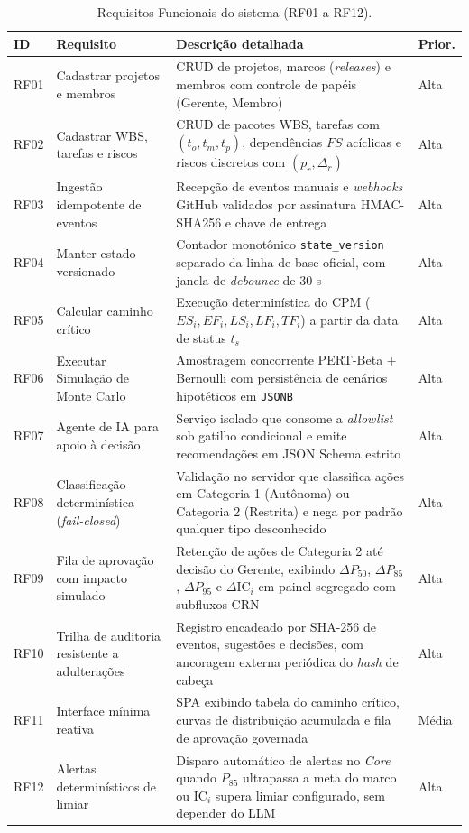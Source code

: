 \documentclass[12pt,openany,oneside,a4paper,english,brazilian,sumario=tradicional]{abntex2}
\newcommand{\fonteautores}{\par\vspace{1mm}{\small Fonte: Elaborado pelos autores (2026).}}
\newcommand{\IC}{\mathrm{IC}}
\begin{document}
\begin{table}[htbp]
\caption{Requisitos Funcionais do sistema (RF01 a RF12).}\label{tab:rf}
\footnotesize
\begin{tabularx}{\textwidth}{L{1cm} L{3.9cm} Y L{1.1cm}}
\toprule
\textbf{ID} & \textbf{Requisito} & \textbf{Descrição detalhada} & \textbf{Prior.}\\
\midrule
RF01 & Cadastrar projetos e membros & CRUD de projetos, marcos (\textit{releases}) e membros com controle de papéis (Gerente, Membro) & Alta\\
RF02 & Cadastrar WBS, tarefas e riscos & CRUD de pacotes WBS, tarefas com $(t_o,t_m,t_p)$, dependências $FS$ acíclicas e riscos discretos com $(p_r, \Delta_r)$ & Alta\\
RF03 & Ingestão idempotente de eventos & Recepção de eventos manuais e \textit{webhooks} GitHub validados por assinatura HMAC-SHA256 e chave de entrega & Alta\\
RF04 & Manter estado versionado & Contador monotônico \texttt{state\_version} separado da linha de base oficial, com janela de \textit{debounce} de 30 s & Alta\\
RF05 & Calcular caminho crítico & Execução determinística do CPM ($ES_i, EF_i, LS_i, LF_i, TF_i$) a partir da data de status $t_s$ & Alta\\
RF06 & Executar Simulação de Monte Carlo & Amostragem concorrente PERT-Beta + Bernoulli com persistência de cenários hipotéticos em \texttt{JSONB} & Alta\\
RF07 & Agente de IA para apoio à decisão & Serviço isolado que consome a \textit{allowlist} sob gatilho condicional e emite recomendações em JSON Schema estrito & Alta\\
RF08 & Classificação determinística (\textit{fail-closed}) & Validação no servidor que classifica ações em Categoria 1 (Autônoma) ou Categoria 2 (Restrita) e nega por padrão qualquer tipo desconhecido & Alta\\
RF09 & Fila de aprovação com impacto simulado & Retenção de ações de Categoria 2 até decisão do Gerente, exibindo $\Delta P_{50}$, $\Delta P_{85}$, $\Delta P_{95}$ e $\Delta\IC_i$ em painel segregado com subfluxos CRN & Alta\\
RF10 & Trilha de auditoria resistente a adulterações & Registro encadeado por SHA-256 de eventos, sugestões e decisões, com ancoragem externa periódica do \textit{hash} de cabeça & Alta\\
RF11 & Interface mínima reativa & SPA exibindo tabela do caminho crítico, curvas de distribuição acumulada e fila de aprovação governada & Média\\
RF12 & Alertas determinísticos de limiar & Disparo automático de alertas no \textit{Core} quando $P_{85}$ ultrapassa a meta do marco ou $\IC_i$ supera limiar configurado, sem depender do LLM & Alta\\
\bottomrule
\end{tabularx}
\fonteautores
\end{table}
\end{document}
